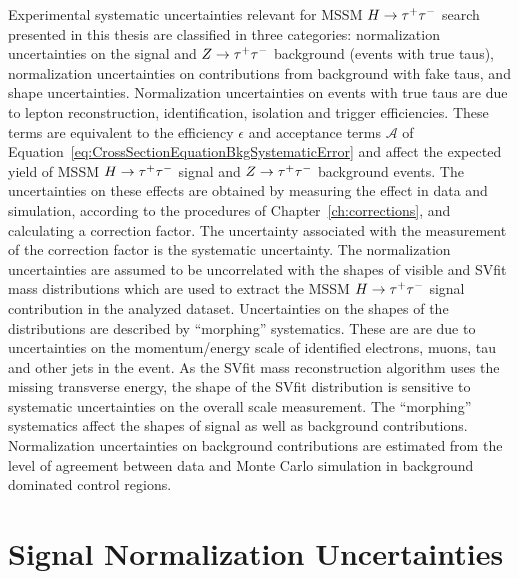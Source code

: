 Experimental systematic uncertainties relevant for MSSM $H \to \tau^+\tau^-$ search
presented in this thesis are classified in three categories: normalization
uncertainties on the signal and $Z\to\tau^+\tau^-$ background (events with true taus),
normalization uncertainties on contributions from background with fake taus, and
shape uncertainties.  Normalization uncertainties on events with true taus are
due to lepton reconstruction, identification, isolation and trigger
efficiencies.  These terms are equivalent to the efficiency $\epsilon$ and
acceptance terms $\mathcal{A}$ of
Equation~\ref{eq:CrossSectionEquationBkgSystematicError} and affect the expected
yield of MSSM $H \to \tau^+\tau^-$ signal and $Z \to \tau^+\tau^-$ background events.  The
uncertainties on these effects are obtained by measuring the effect in data and
simulation, according to the procedures of Chapter~\ref{ch:corrections}, and
calculating a correction factor.  The uncertainty associated with the
measurement of the correction factor is the systematic uncertainty.  The
normalization uncertainties are assumed to be uncorrelated with the
shapes of visible and SVfit mass distributions which are
used to extract the MSSM $H \to \tau^+\tau^-$ signal contribution in the analyzed
dataset.  Uncertainties on the shapes of the distributions are described by
``morphing'' systematics.  These are are due to uncertainties on the
momentum/energy scale of identified electrons, muons, tau and other jets in the
event.  As the SVfit mass reconstruction algorithm uses the missing transverse
energy, the shape of the SVfit distribution is sensitive to systematic
uncertainties on the overall scale \MET measurement.  The ``morphing''
systematics affect the shapes of signal as well as background contributions.
Normalization uncertainties on background contributions are estimated from the
level of agreement between data and Monte Carlo simulation in background
dominated control regions.

\section{Signal Normalization Uncertainties}

